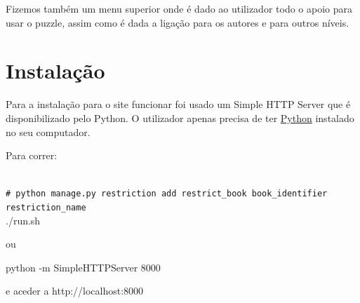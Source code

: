 \documentclass[pdftex,12pt,a4paper]{report}
\newcommand{\shellcmd}[1]{\\\indent\indent\texttt{\footnotesize\# #1}\\}
\begin{document}
Fizemos também um menu superior onde é dado ao utilizador todo o apoio para usar o puzzle, assim como é dada a ligação para os autores e para outros níveis.

\section{Instalação}

Para a instalação para o site funcionar foi usado um Simple HTTP Server que é disponibilizado pelo Python. O utilizador apenas precisa de ter \href{https://www.python.org/downloads/}{Python} instalado no seu computador.

Para correr:

\shellcmd{python manage.py restriction add restrict{\_}book book{\_}identifier \linebreak restriction{\_}name}

./run.sh

ou

python -m SimpleHTTPServer 8000

e aceder a http://localhost:8000
\end{document}
